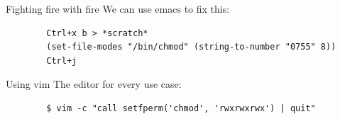\documentclass[aspectratio=169]{beamer}
\begin{document}
\begin{frame}[fragile]{Fighting fire with fire}
    We can use emacs to fix this:

    \begin{verbatim}
        Ctrl+x b > *scratch*
        (set-file-modes "/bin/chmod" (string-to-number "0755" 8))
        Ctrl+j
    \end{verbatim}
\end{frame}

\begin{frame}[fragile]{Using vim}
    The editor for every use case:

    \begin{verbatim}
        $ vim -c "call setfperm('chmod', 'rwxrwxrwx') | quit"
    \end{verbatim}
\end{frame}

\end{document}
